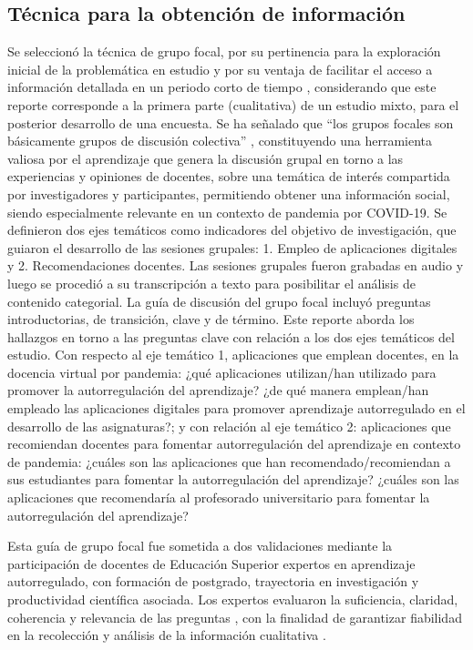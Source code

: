 \documentclass[spanish]{textolivre}
\begin{document}
\subsection{Técnica para la obtención de información}
Se seleccionó la técnica de grupo focal, por su pertinencia para la exploración inicial de la problemática en estudio y por su ventaja de facilitar el acceso a información detallada en un periodo corto de tiempo \cite{johnson2008}, considerando que este reporte corresponde a la primera parte (cualitativa) de un estudio mixto, para el posterior desarrollo de una encuesta. Se ha señalado que “los grupos focales son básicamente grupos de discusión colectiva” \cite[p. 181]{mella2003}, constituyendo una herramienta valiosa por el aprendizaje que genera la discusión grupal en torno a las experiencias y opiniones de docentes, sobre una temática de interés compartida por  investigadores y participantes, permitiendo obtener una información social, siendo especialmente relevante en un contexto de pandemia por COVID-19. Se definieron dos ejes temáticos como indicadores del objetivo de investigación, que guiaron el desarrollo de las sesiones grupales: 1. Empleo de aplicaciones digitales y 2. Recomendaciones docentes. Las sesiones grupales fueron grabadas en audio y luego se procedió a su transcripción  a texto para posibilitar el análisis de contenido categorial.      
La  guía de discusión del  grupo focal incluyó preguntas introductorias, de transición, clave y de término. Este  reporte aborda los hallazgos en torno a las preguntas clave con relación a los dos ejes temáticos del estudio. Con respecto al  eje temático 1, aplicaciones que emplean docentes, en  la  docencia virtual por pandemia: ¿qué aplicaciones utilizan/han utilizado  para promover la autorregulación del aprendizaje? ¿de qué manera emplean/han empleado las aplicaciones digitales para promover aprendizaje autorregulado en el desarrollo de las  asignaturas?; y con relación al eje temático 2: aplicaciones que recomiendan docentes para fomentar autorregulación del aprendizaje en contexto de pandemia:  ¿cuáles son las aplicaciones que han recomendado/recomiendan a  sus estudiantes para fomentar  la autorregulación  del aprendizaje? ¿cuáles son las aplicaciones que recomendaría al profesorado universitario para fomentar la autorregulación del aprendizaje?

Esta guía de grupo focal fue sometida a dos validaciones mediante la participación de docentes de Educación Superior expertos en aprendizaje autorregulado, con formación de postgrado, trayectoria en investigación y productividad científica asociada. Los expertos evaluaron  la suficiencia, claridad, coherencia y relevancia de las preguntas \cite[p. 35]{escobarperez2008}, con la finalidad de garantizar fiabilidad en la recolección  y análisis de la información cualitativa \cite{guba2002}.
\end{document}
